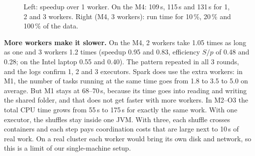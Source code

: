 \documentclass[sigconf]{acmart}
\begin{document}
\begin{figure}[h]
\hfill
{}
\caption{Left: speedup over 1 worker. On the M4: 109\,s, 115\,s and 131\,s for 1, 2 and 3 workers. Right (M4,
3 workers): run time for 10\,\%, 20\,\% and 100\,\% of the data.}
\label{fig:scaling}
\end{figure}

\textbf{More workers make it slower.} On the M4, 2 workers take 1.05 times as long as one and 3 workers 1.2 times
(speedup 0.95 and 0.83, efficiency $S/p$ of 0.48 and 0.28; on the Intel laptop 0.55 and 0.40). The pattern repeated in all 3 rounds, and the logs confirm 1, 2 and 3 executors. Spark does
use the extra workers: in M1, the number of tasks running at the same time goes from 1.8 to 3.5 to 5.0 on average.
But M1 stays at 68--70\,s, because its time goes into reading and writing the shared folder, and that does not get
faster with more workers. In M2--O3 the total CPU time grows from 55\,s to 175\,s for exactly the same work. With
one executor, the shuffles stay inside one JVM. With three, each shuffle crosses containers and each step pays
coordination costs that are large next to 10\,s of real work. On a real cluster each worker would bring its own
disk and network, so this is a limit of our single-machine setup.
\end{document}
